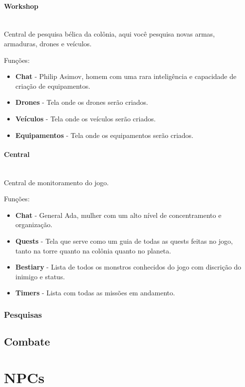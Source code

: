 \documentclass[11pt]{article} %
\begin{document}
\paragraph{Workshop} \mbox{}\\
Central de pesquisa bélica da colônia, aqui você pesquisa novas armas, armaduras, drones e veículos.

Funções:
\begin{itemize}
  \item \textbf{Chat} - Philip Asimov, homem com uma rara inteligência e capacidade de criação de equipamentos.
  \item \textbf{Drones} - Tela onde os drones serão criados.
  \item \textbf{Veículos} - Tela onde os veículos serão criados.
  \item \textbf{Equipamentos} - Tela onde os equipamentos serão criados. 
\end{itemize}

\paragraph{Central} \mbox{}\\
Central de monitoramento do jogo.

Funções:
\begin{itemize}
  \item \textbf{Chat} - General Ada, mulher com um alto nível de concentramento e organização.
  \item \textbf{Quests} - Tela que serve como um guia de todas as quests feitas no jogo, tanto na torre quanto na colônia quanto no planeta.
  \item \textbf{Bestiary} - Lista de todos os monstros conhecidos do jogo com discrição do inimigo e status.
  \item \textbf{Timers} - Lista com todas as missões em andamento.
\end{itemize}

\subsubsection{Pesquisas}

\subsection{Combate}

\newpage

\section{NPCs}
\end{document}
